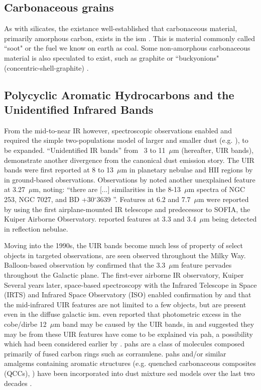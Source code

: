 \subsection{Carbonaceous grains}
      As with silicates, the existance well-established that carbonaceous material, primarily amorphous carbon, exists in the \gls{ism} \citep{aitken81,tielens87}. This is material commonly called ``soot" or the fuel we know on earth as coal.    Some non-amorphous carbonaceous material is also speculated to exist, such as graphite \citep{zhou06} or ``buckyonions" (concentric-shell-graphite) \citep{li08}.

\subsection{Polycyclic Aromatic Hydrocarbons and the Unidentified Infrared Bands}
    From the mid-to-near IR however, spectroscopic observations enabled and required the simple two-populations model of larger and smaller dust (e.g. \cite{mathis77}), to be expanded. ``Unidentified IR bands'' from~ 3 to 11~$\mu$m (hereafter, UIR bands), demonstrate another divergence from the canonical dust emission story. The UIR bands were first reported at 8 to 13~$\mu$m in planetary nebulae and HII regions by \cite{gillet73, gillett75} in ground-based observations. Observations by \cite{merrill75} noted another unexplained feature at 3.27~$\mu$m, noting: ``there are [...] similarities in the 8-13~$\mu$m spectra of NGC 253, NGC 7027, and BD +30$^\circ$3639 \cite{gillett75}''. Features at 6.2 and 7.7~$\mu$m were reported by \cite{russell77b} using the first airplane-mounted IR telescope and predecessor to SOFIA, the Kuiper Airborne Observatory. \cite{sellgren83} reported features at 3.3 and 3.4~$\mu$m being detected in reflection nebulae.

     Moving into the 1990s, the UIR bands become much less of property of select objects in targeted observations, are seen observed throughout the Milky Way. Balloon-based observation by \cite{giard94} confirmed that the 3.3~$\mu$m feature pervades throughout the Galactic plane. The first-ever airborne IR observatory, Kuiper Several years later, space-based spectroscopy with the Infrared Telescope in Space (IRTS)\citep{murakami96} and Infrared Space Observatory (ISO)\citep{kessler96} enabled confirmation by \cite{onaka96} and \cite{mattila96} that the mid-infrared UIR features are not limited to a few objects, but are present even in the diffuse galactic \gls{ism}. \cite{dwek97} even reported that photometric excess in the \gls{cobe}/\gls{dirbe} 12~$\mu$m band may be caused by the UIR bands, in and suggested they may be from these UIR features have come to be explained via \gls{pah}, a possibility which had been considered earlier by \cite{allamandola85,puget85}. \gls{pah}s are a class of molecules composed primarily of fused carbon rings such as corranulene. \gls{pah}s and/or similar amalgems containing aromatic structures (e.g. quenched carbonaceous composites (QCCs), \cite{sakata84}) have been incorporated into dust mixture \gls{sed} models over the last two decades \citep{drli01, drli07, hony01, dustem11, galliano11, jones13, jones17}.


